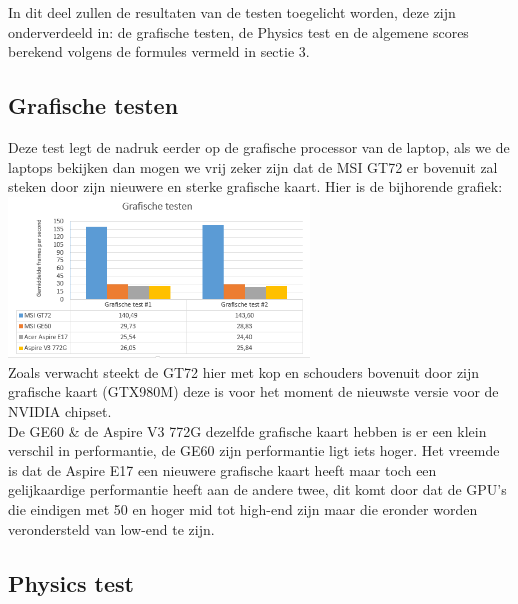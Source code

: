 In dit deel zullen de resultaten van de testen toegelicht worden, deze zijn onderverdeeld in: de grafische testen, de Physics test en de algemene scores berekend volgens de formules vermeld in sectie 3.

\subsection{Grafische testen}

Deze test legt de nadruk eerder op de grafische processor van de laptop, als we de laptops bekijken dan mogen we vrij zeker zijn dat de MSI GT72 er bovenuit zal steken door zijn nieuwere en sterke grafische kaart. Hier is de bijhorende grafiek: \\
\includegraphics[width=8cm]{grafische}\\
Zoals verwacht steekt de GT72 hier met kop en schouders bovenuit door zijn grafische kaart (GTX980M) deze is voor het moment de nieuwste versie voor de NVIDIA chipset.\\
De GE60 & de Aspire V3 772G dezelfde grafische kaart hebben is er een klein verschil in performantie, de GE60 zijn performantie ligt iets hoger.
Het vreemde is dat de Aspire E17 een nieuwere grafische kaart heeft maar toch een gelijkaardige performantie heeft aan de andere twee, dit komt door dat de GPU's die eindigen met 50 en hoger mid tot high-end zijn maar die eronder worden verondersteld van low-end te zijn.

\subsection{Physics test}

